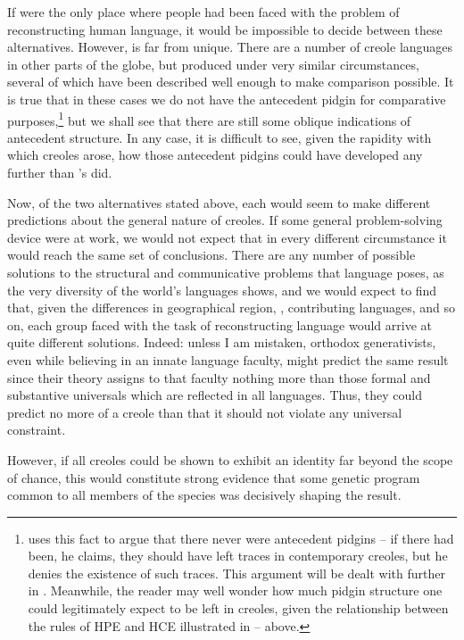 If  were the only place where people had been faced with the problem of reconstructing human language, it would be impossible to decide between these alternatives. However,  is far from unique. There are a number of creole languages in other parts of the globe, but produced under very similar circumstances, several of which have been described well enough to make comparison possible. It is true that in these cases we do not have the antecedent pidgin for comparative purposes,\footnote{\citet{Alleyne1979} uses this fact to argue that there never were antecedent pidgins -- if there had been, he claims, they should have left traces in contemporary creoles, but he denies the existence of such traces. This argument will be dealt with further in . Meanwhile, the reader may well wonder how much pidgin structure one could legitimately expect to be left in creoles, given the relation\-ship between the rules of HPE and HCE illustrated in -- above.} but we shall see that there are still some oblique indications of antecedent structure. In any case, it is difficult to see, given the rapidity with which creoles arose, how those antecedent pidgins could have developed any further than 's did.


Now, of the two alternatives stated above, each would seem to make different predictions about the general nature of creoles. If some general problem-solving device were at work, we would not expect that in every different circumstance it would reach the same set of conclusions. There are any number of possible solutions to the struc\-tural and communicative problems that language poses, as the very diversity of the world's languages shows, and we would expect to find that, given the differences in geographical region, , contributing languages, and so on, each group faced with the task of reconstructing language would arrive at quite different solutions. Indeed: unless I am mistaken, orthodox generativists, even while believing in an innate language faculty, might predict the same result since their theory assigns to that faculty nothing more than those formal and substantive universals which are reflected in all languages. Thus, they could pre\-dict no more of a creole than that it should not violate any universal constraint.

However, if all creoles could be shown to exhibit an identity far beyond the scope of chance, this would constitute strong evidence that some genetic program common to all members of the species was decisively shaping the result.

